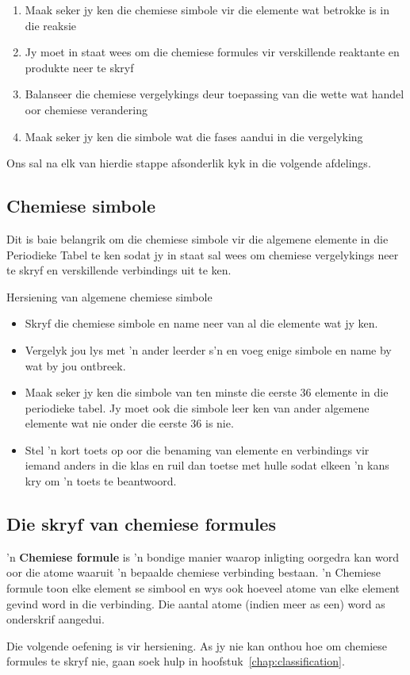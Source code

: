 \begin{enumerate}[noitemsep, label=\textbf{\arabic*}. ] 
\item Maak seker jy ken die chemiese simbole vir die elemente wat betrokke is in die reaksie
\item Jy moet in staat wees om die chemiese formules vir verskillende reaktante en produkte neer te skryf
\item Balanseer die chemiese vergelykings deur toepassing van die wette wat handel oor chemiese verandering 
\item Maak seker jy ken die simbole wat die fases aandui in die vergelyking
\end{enumerate}
Ons sal na elk van hierdie stappe afsonderlik kyk in die volgende afdelings.
    \label{m38721*cid2}
            \subsection*{Chemiese simbole}
            \nopagebreak
Dit is baie belangrik om die chemiese simbole vir die algemene elemente in die Periodieke Tabel te ken
sodat jy in staat sal wees om chemiese vergelykings neer te skryf en verskillende verbindings uit te ken.\\
            \begin{activity}{Hersiening van algemene chemiese simbole}
            \nopagebreak
      \label{m38721*id62763}\begin{itemize}[noitemsep]
            \label{m38721*uid5}\item Skryf die chemiese simbole en name neer van al die elemente wat jy ken.
\label{m38721*uid6}\item Vergelyk jou lys met 'n ander leerder s’n en voeg enige simbole en name by wat by jou ontbreek.
\label{m38721*uid7}\item Maak seker jy ken die simbole van ten minste die eerste 36 elemente in die periodieke tabel. Jy moet ook die simbole leer ken van ander algemene elemente wat nie onder die eerste 36 is nie.
\label{m38721*uid8}\item Stel 'n kort toets op oor die benaming van elemente en verbindings vir iemand anders in die klas en ruil dan toetse met hulle sodat elkeen  'n kans kry om  'n toets te beantwoord.
\end{itemize}
\end{activity}
    \label{m38721*cid3}
\subsection*{Die skryf van chemiese formules}
\nopagebreak
\label{m38721*id62835} 'n \textbf{Chemiese formule} is 'n bondige manier waarop inligting oorgedra kan word oor die atome waaruit 'n bepaalde chemiese verbinding bestaan. 'n Chemiese formule toon elke element se simbool en wys ook hoeveel atome van elke element gevind word in die verbinding. Die aantal atome (indien meer as een) word as onderskrif aangedui.\par 
Die volgende oefening is vir hersiening. As jy nie kan onthou hoe om chemiese formules te skryf nie, gaan soek hulp in hoofstuk~\ref{chap:classification}.

